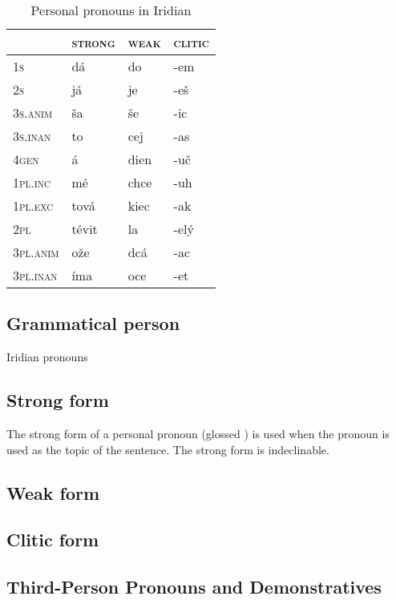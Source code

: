 \begin{table}[h!]
	\caption{Personal pronouns in Iridian}
	\centering\small
	\begin{tabularx}{0.8\textwidth}{>{\scshape}YMMM}

		\toprule
		 &\textsc{strong} &\textsc{weak}&\textsc{clitic}\\
		\midrule
		1s &dá&do&-em\\ \addlinespace
		2s&já&je&-e\v{s}\\ \addlinespace
		3s.anim&\v{s}a&\v{s}e&-ic\\ \addlinespace
		3s.inan&to&cej&-as\\ \addlinespace
		4gen&á&dien&-u\v{c}\\ \addlinespace
		1pl.inc&m\'e&chce&-uh\\ \addlinespace
		1pl.exc&tov\'a&kiec&-ak\\ \addlinespace
		2pl&t\'evit&la&-elý\\ \addlinespace
		3pl.anim&o\v{z}e&dcá&-ac\\ \addlinespace
		3pl.inan&\'ima&oce&-et\\ \bottomrule
	\end{tabularx}
\end{table}

\subsection{Grammatical person}
Iridian pronouns
\subsection{Strong form}

The strong form of a personal pronoun (glossed ) is used when the pronoun is used as the topic of the sentence. The strong form is indeclinable.

\subsection{Weak form}

\subsection{Clitic form}

\subsection{Third-Person Pronouns and Demonstratives}


